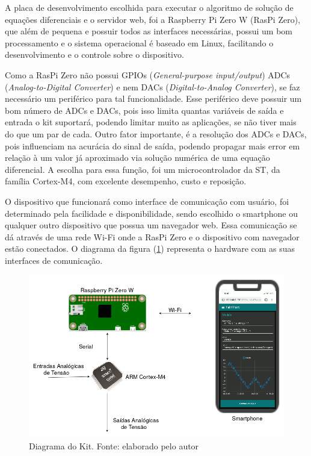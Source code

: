\documentclass[journal]{IEEEtranTIE}
\begin{document}
A placa de desenvolvimento escolhida para executar o algoritmo de solução de equações diferenciais e o servidor web, foi a Raspberry Pi Zero W (RasPi Zero), que além de pequena e possuir todos as interfaces necessárias, possui um bom processamento e o sistema operacional é baseado em Linux, facilitando o desenvolvimento e o controle sobre o dispositivo.

Como a RasPi Zero não possui GPIOs (\textit{General-purpose input/output}) ADCs (\textit{Analog-to-Digital Converter}) e nem DACs (\textit{Digital-to-Analog Converter}), se faz necessário um periférico para tal funcionalidade. Esse periférico deve possuir um bom número de ADCs e DACs, pois isso limita quantas variáveis de saída e entrada o kit suportará, podendo limitar muito as aplicações, se não tiver mais do que um par de cada. Outro fator importante, é a resolução dos ADCs e DACs, pois influenciam na acurácia do sinal de saída, podendo propagar mais error em relação à um valor já aproximado via solução numérica de uma equação diferencial. A escolha para essa função, foi um microcontrolador da ST, da família Cortex-M4, com excelente desempenho, custo e reposição.

O dispositivo que funcionará como interface de comunicação com usuário, foi determinado pela facilidade e disponibilidade, sendo escolhido o smartphone ou qualquer outro dispositivo que possua um navegador web. Essa comunicação se dá através de uma rede Wi-Fi onde a RasPi Zero e o dispositivo com navegador estão conectados. O diagrama da figura (\ref{fig:diagrama}) representa o hardware com as suas interfaces de comunicação.

\begin{figure}[!h]
	\includegraphics[width=\linewidth]{img/diagrama.png}
    \caption{Diagrama do Kit. Fonte: elaborado pelo autor}
    \label{fig:diagrama}
\end{figure}
\end{document}
